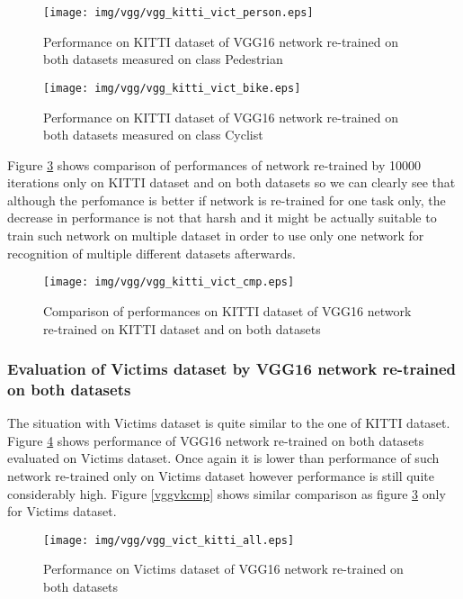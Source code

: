 \begin{figure}[!]
\texttt{[image: img/vgg/vgg\_kitti\_vict\_person.eps]}
\caption[Performance of VGG16 network on KITTI+Victims datasets, class Pedestrian]{Performance on KITTI dataset of VGG16 network re-trained on both datasets measured on class Pedestrian}
\label{vggkittivp}
\end{figure}

\begin{figure}[!]
\texttt{[image: img/vgg/vgg\_kitti\_vict\_bike.eps]}
\caption[Performance of VGG16 network on KITTI+Victims datasets, class Cyclist]{Performance on KITTI dataset of VGG16 network re-trained on both datasets measured on class Cyclist}
\label{vggkittivb}
\end{figure}

Figure \ref{vggkittivcmp} shows comparison of performances of network re-trained by 10000 iterations only on KITTI dataset and on both datasets so we can clearly see that although the perfomance is better if network is re-trained for one task only, the decrease in performance is not that harsh and it might be actually suitable to train such network on multiple dataset in order to use only one network for recognition of multiple different datasets afterwards.

\begin{figure}[!]
\texttt{[image: img/vgg/vgg\_kitti\_vict\_cmp.eps]}
\caption[Comparison of performances of VGG16 networks, KITTI dataset]{Comparison of performances on KITTI dataset of VGG16 network re-trained on KITTI dataset and on both datasets}
\label{vggkittivcmp}
\end{figure}

\subsubsection{Evaluation of Victims dataset by VGG16 network re-trained on both datasets}
The situation with Victims dataset is quite similar to the one of KITTI dataset. Figure \ref{vggvkall} shows performance of VGG16 network re-trained on both datasets evaluated on Victims dataset. Once again it is lower than performance of such network re-trained only on Victims dataset however performance is still quite considerably high. Figure \ref{vggvkcmp} shows similar comparison as figure \ref{vggkittivcmp} only for Victims dataset.

\begin{figure}[!]
\texttt{[image: img/vgg/vgg\_vict\_kitti\_all.eps]}
\caption[Performance of VGG16 network on Victims+KITTI datasets]{Performance on Victims dataset of VGG16 network re-trained on both datasets}
\label{vggvkall}
\end{figure}

